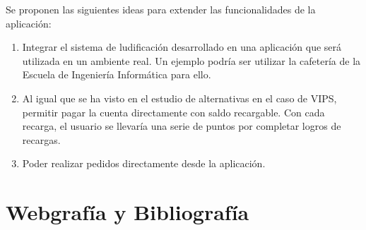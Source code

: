\documentclass[twoside]{report}
\begin{document}
Se proponen las siguientes ideas para extender las funcionalidades de la aplicación:

\begin{enumerate}
\item Integrar el sistema de ludificación desarrollado en una aplicación que será utilizada en un ambiente real. Un ejemplo podría ser utilizar la cafetería de la Escuela de Ingeniería Informática para ello.

\item Al igual que se ha visto en el estudio de alternativas en el caso de VIPS, permitir pagar la cuenta directamente con saldo recargable. Con cada recarga, el usuario se llevaría una serie de puntos por completar logros de recargas.

\item Poder realizar pedidos directamente desde la aplicación.
\end{enumerate}

\chapter{Webgrafía y Bibliografía}
\end{document}
